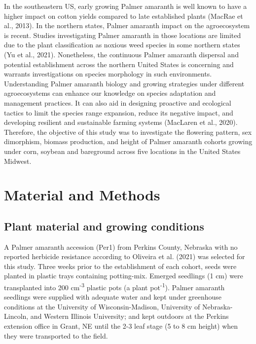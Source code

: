 \documentclass[utf8]{frontiersSCNS}
\begin{document}
In the southeastern US, early growing Palmer amaranth is well known to
have a higher impact on cotton yields compared to late established
plants (MacRae et al., 2013). In the northern states, Palmer amaranth
impact on the agroecosystem is recent. Studies investigating Palmer
amaranth in those locations are limited due to the plant classification
as noxious weed species in some northern states (Yu et al., 2021).
Nonetheless, the continuous Palmer amaranth dispersal and potential
establishment across the northern United States is concerning and
warrants investigations on species morphology in such environments.
Understanding Palmer amaranth biology and growing strategies under
different agroecosystems can enhance our knowledge on species adaptation
and management practices. It can also aid in designing proactive and
ecological tactics to limit the species range expansion, reduce its
negative impact, and developing resilient and sustainable farming
systems (MacLaren et al., 2020). Therefore, the objective of this study
was to investigate the flowering pattern, sex dimorphism, biomass
production, and height of Palmer amaranth cohorts growing under corn,
soybean and bareground across five locations in the United States
Midwest.

\hypertarget{material-and-methods}{%
\section*{Material and Methods}\label{material-and-methods}}

\hypertarget{plant-material-and-growing-conditions}{%
\subsection*{Plant material and growing
conditions}\label{plant-material-and-growing-conditions}}

A Palmer amaranth accession (Per1) from Perkins County, Nebraska with no
reported herbicide resistance according to Oliveira et al. (2021) was
selected for this study. Three weeks prior to the establishment of each
cohort, seeds were planted in plastic trays containing potting-mix.
Emerged seedlings (1 cm) were transplanted into 200
cm\textsuperscript{-3} plastic pots (a plant pot\textsuperscript{-1}).
Palmer amaranth seedlings were supplied with adequate water and kept
under greenhouse conditions at the University of Wisconsin-Madison,
University of Nebraska-Lincoln, and Western Illinois University; and
kept outdoors at the Perkins extension office in Grant, NE until the 2-3
leaf stage (5 to 8 cm height) when they were transported to the field.
\end{document}
